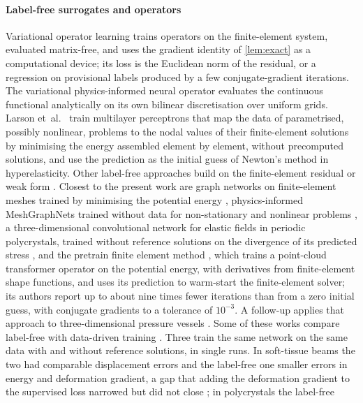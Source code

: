 \paragraph{Label-free surrogates and operators}
Variational operator learning \cite{Xu2024VOL} trains operators on the finite-element
system, evaluated matrix-free, and uses the gradient identity of \cref{lem:exact} as a
computational device; its loss is the Euclidean norm of the residual, or a regression on
provisional labels produced by a few conjugate-gradient iterations. The variational
physics-informed neural operator \cite{Eshaghi2025VINO} evaluates the continuous functional
analytically on its own bilinear discretisation over uniform grids. Larson
et~al.~\cite{Larson2026MLPEnergy} train multilayer perceptrons that map the data of
parametrised, possibly nonlinear, problems to the nodal values of their finite-element
solutions by minimising the energy assembled element by element, without precomputed
solutions, and use the prediction as the initial guess of Newton's method in
hyperelasticity. Other label-free approaches build on the finite-element residual or weak
form
\cite{Lee2025FEONet,Uriarte2022,Gao2022,Goswami2022}. Closest to the present work are graph
networks on finite-element meshes trained by minimising the potential energy
\cite{Dalton2023}, physics-informed MeshGraphNets trained without data for non-stationary
and nonlinear problems \cite{Wurth2024}, a three-dimensional convolutional network for
elastic fields in periodic polycrystals, trained without reference solutions on the
divergence of its predicted stress \cite{MonteiroFernandes2025}, and the pretrain finite
element method \cite{Wang2026PretrainFEM}, which trains a point-cloud transformer operator
on the potential energy, with derivatives from finite-element shape functions, and uses its
prediction to warm-start the finite-element solver; its authors report up to about nine
times fewer iterations than from a zero initial guess, with conjugate gradients to a
tolerance of $10^{-3}$. A follow-up applies that approach to three-dimensional pressure
vessels \cite{Sun2026FEVessel}. Some of these works compare label-free with data-driven
training \cite{Dalton2023,Wurth2024,MonteiroFernandes2025,Sun2026FEVessel}. Three train the
same network on the same data with and without reference solutions, in single runs. In
soft-tissue beams the two had comparable displacement errors and the label-free one smaller
errors in energy and deformation gradient, a gap that adding the deformation gradient to the
supervised loss narrowed but did not close \cite{Dalton2023}; in polycrystals the label-free
